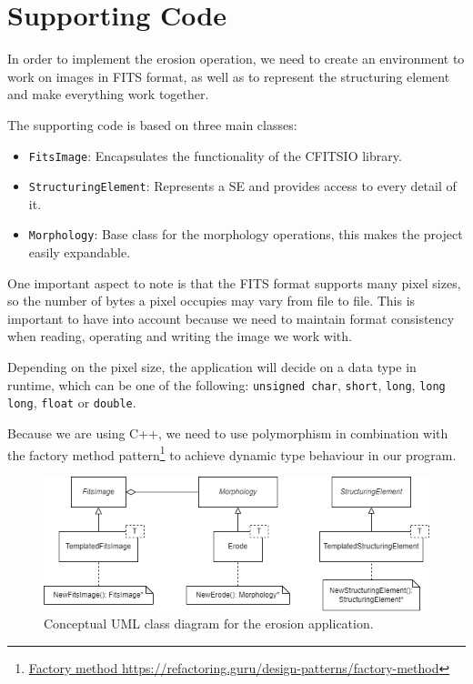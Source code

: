 \section{Supporting Code}

In order to implement the erosion operation, we need to create an environment to work on images in FITS format, as well as to represent the structuring element and make everything work together.

The supporting code is based on three main classes:
\begin{itemize}
    \item \texttt{FitsImage}: Encapsulates the functionality of the CFITSIO library.
    \item \texttt{StructuringElement}: Represents a SE and provides access to every detail of it.
    \item \texttt{Morphology}: Base class for the morphology operations, this makes the project easily expandable.
\end{itemize}

One important aspect to note is that the FITS format supports many pixel sizes, so the number of bytes a pixel occupies may vary from file to file.
This is important to have into account because we need to maintain format consistency when reading, operating and writing the image we work with.

Depending on the pixel size, the application will decide on a data type in runtime, which can be one of the following: \texttt{unsigned char}, \texttt{short}, \texttt{long}, \texttt{long long}, \texttt{float} or \texttt{double}.

Because we are using C++, we need to use polymorphism in combination with the factory method pattern\footnote{\href{https://refactoring.guru/design-patterns/factory-method}{{Factory method} \url{https://refactoring.guru/design-patterns/factory-method}}} to achieve dynamic type behaviour in our program.

\begin{figure}[H]
    \centering
    \includegraphics[width=0.85\linewidth]{images/morph_uml.png}
    \caption{Conceptual UML class diagram for the erosion application.}
    \label{fig:uml-morph-graph}
\end{figure}

